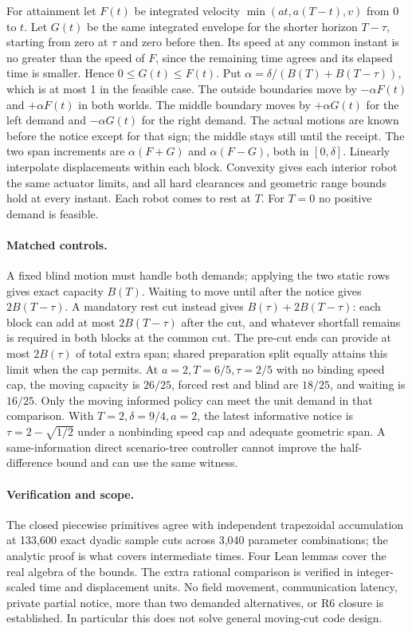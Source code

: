 \documentclass[11pt]{article}
\begin{document}
For attainment let \(F(t)\) be integrated velocity
\(\min(at,a(T-t),v)\) from 0 to \(t\).
Let \(G(t)\) be the same integrated envelope for the shorter
horizon \(T-\tau\), starting from zero at \(\tau\) and zero
before then. Its speed at any common instant is no greater
than the speed of \(F\), since the remaining time agrees and
its elapsed time is smaller. Hence \(0\le G(t)\le F(t)\).
Put \(\alpha=\delta/(B(T)+B(T-\tau))\), which is at most 1 in
the feasible case. The outside boundaries move by
\(-\alpha F(t)\) and \(+\alpha F(t)\) in both worlds.
The middle boundary moves by \(+\alpha G(t)\) for the left
demand and \(-\alpha G(t)\) for the right demand. The actual
motions are known before the notice except for that sign;
the middle stays still until the receipt. The two span
increments are \(\alpha(F+G)\) and \(\alpha(F-G)\), both
in \([0,\delta]\). Linearly interpolate displacements within
each block. Convexity gives each interior robot the same
actuator limits, and all hard clearances and geometric range
bounds hold at every instant. Each robot comes to rest at
\(T\). For \(T=0\) no positive demand is feasible.

\paragraph{Matched controls.}
A fixed blind motion must handle both demands; applying the
two static rows gives exact capacity \(B(T)\). Waiting to
move until after the notice gives \(2B(T-\tau)\). A mandatory
rest cut instead gives \(B(\tau)+2B(T-\tau)\): each block
can add at most \(2B(T-\tau)\) after the cut, and whatever
shortfall remains is required in both blocks at the common
cut. The pre-cut ends can provide at most \(2B(\tau)\) of
total extra span; shared preparation split equally attains
this limit when the cap permits. At \(a=2,T=6/5,\tau=2/5\)
with no binding speed cap, the moving capacity is \(26/25\),
forced rest and blind are \(18/25\), and waiting is \(16/25\).
Only the moving informed policy can meet the unit demand in
that comparison. With \(T=2,\delta=9/4,a=2\), the latest
informative notice is \(\tau=2-\sqrt{1/2}\) under a nonbinding
speed cap and adequate geometric span. A same-information
direct scenario-tree controller cannot improve the half-difference
bound and can use the same witness.

\paragraph{Verification and scope.}
The closed piecewise primitives agree with independent
trapezoidal accumulation at 133,600 exact dyadic sample cuts
across 3,040 parameter combinations; the analytic proof is what
covers intermediate times. Four Lean lemmas cover the real
algebra of the bounds. The extra rational comparison is
verified in integer-scaled time and displacement units.
No field movement, communication latency, private partial
notice, more than two demanded alternatives, or R6 closure
is established. In particular this does not solve general
moving-cut code design.
\end{document}
